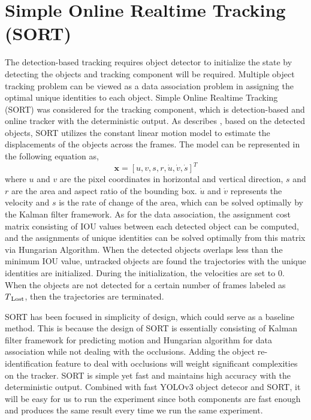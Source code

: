 \section{Simple Online Realtime Tracking (SORT)}
\label{sec:background/section_b}

The detection-based tracking requires object detector to initialize the state by detecting the objects and tracking component will be required. Multiple object tracking problem can be viewed as a data association problem in assigning the optimal unique identities to each object. Simple Online Realtime Tracking (SORT) was considered for the tracking component, which is detection-based and online tracker with the deterministic output. As \citeauthor{bewley_simple_2016} describes \cite{bewley_simple_2016}, based on the detected objects, SORT utilizes the constant linear motion model to estimate the displacements of the objects across the frames. The model can be represented in the following equation as,
\begin{equation}
\textbf{x} = [u, v, s, r, \dot{u}, \dot{v}, \dot{s}]^T
\label{eq:SORT_model}
\end{equation}
where $u$ and $v$ are the pixel coordinates in horizontal and vertical direction, $s$ and $r$ are the area and aspect ratio of the bounding box. $\dot{u}$ and $\dot{v}$ represents the velocity and $s$ is the rate of change of the area, which can be solved optimally by the Kalman filter framework. As for the data association, the assignment cost matrix consisting of IOU values between each detected object can be computed, and the assignments of unique identities can be solved optimally from this matrix via Hungarian Algorithm. When the detected objects overlaps less than the minimum IOU value, untracked objects are found the trajectories with the unique identities are initialized. During the initialization, the velocities are set to 0. When the objects are not detected for a certain number of frames labeled as $T\textsubscript{Lost}$, then the trajectories are terminated.

SORT has been focused in simplicity of design, which could serve as a baseline method. This is because the design of SORT is essentially consisting of Kalman filter framework for predicting motion and Hungarian algorithm for data association while not dealing with the occlusions. Adding the object re-identification feature to deal with occlusions will weight significant complexities on the tracker. SORT is simple yet fast and maintains high accuracy with the deterministic output. Combined with fast YOLOv3 object detecor and SORT, it will be easy for us to run the experiment since both components are fast enough and produces the same result every time we run the same experiment.